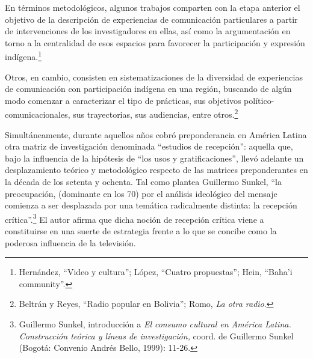 \documentclass{tufte-handout}
\begin{document}
En términos metodológicos, algunos trabajos comparten con la etapa
anterior el objetivo de la descripción de experiencias de comunicación
particulares a partir de intervenciones de los investigadores en ellas,
así como la argumentación en torno a la centralidad de esos espacios
para favorecer la participación y expresión indígena.\footnote{Hernández,
  ``Video y cultura''; López, ``Cuatro propuestas''; Hein, ``Baha'i
  community''.}

Otros, en cambio, consisten en sistematizaciones de la diversidad de
experiencias de comunicación con participación indígena en una región,
buscando de algún modo comenzar a caracterizar el tipo de prácticas, sus
objetivos político-comunicacionales, sus trayectorias, sus audiencias,
entre otros.\footnote{Beltrán y Reyes, ``Radio popular en Bolivia'';
  Romo, \emph{La otra radio}.}

Simultáneamente, durante aquellos años cobró preponderancia en América
Latina otra matriz de investigación denominada ``estudios de
recepción'': aquella que, bajo la influencia de la hipótesis de ``los
usos y gratificaciones'', llevó adelante un desplazamiento teórico y
metodológico respecto de las matrices preponderantes en la década de los
setenta y ochenta. Tal como plantea Guillermo Sunkel, ``la preocupación,
(dominante en los 70) por el análisis ideológico del mensaje comienza a
ser desplazada por una temática radicalmente distinta: la recepción
crítica''.\footnote{Guillermo Sunkel, introducción a \emph{El consumo
  cultural en América Latina. Construcción teórica y líneas de
  investigación,} coord. de Guillermo Sunkel (Bogotá: Convenio Andrés
  Bello, 1999): 11-26.} El autor afirma que dicha noción de recepción
crítica viene a constituirse en una suerte de estrategia frente a lo que
se concibe como la poderosa influencia de la televisión.
\end{document}
